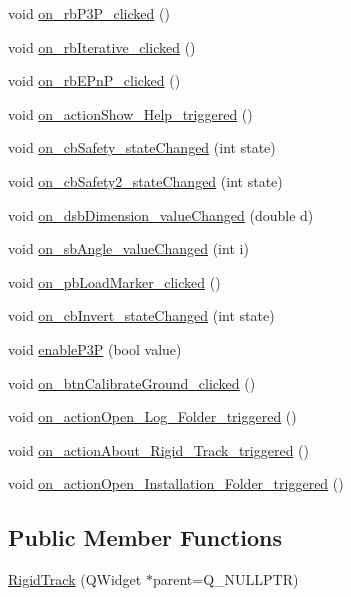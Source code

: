 \begin{DoxyCompactItemize}
\item 
void \hyperlink{class_rigid_track_ac1f10ea5ec3f718c152e245a04776454}{on\+\_\+rb\+P3\+P\+\_\+clicked} ()
\item 
void \hyperlink{class_rigid_track_ae5bcdd3fb7203b4a7d1fa97c1460af31}{on\+\_\+rb\+Iterative\+\_\+clicked} ()
\item 
void \hyperlink{class_rigid_track_a19bc46333f946e589184eeed998160da}{on\+\_\+rb\+E\+Pn\+P\+\_\+clicked} ()
\item 
void \hyperlink{class_rigid_track_af14465ac3ad6957b939c63cbae2d7d8c}{on\+\_\+action\+Show\+\_\+\+Help\+\_\+triggered} ()
\item 
void \hyperlink{class_rigid_track_a8f999fa968f4cc9fa548bdc8438b32c4}{on\+\_\+cb\+Safety\+\_\+state\+Changed} (int state)
\item 
void \hyperlink{class_rigid_track_ad6ba1cfe25f18ff0d9f5993aafa36d16}{on\+\_\+cb\+Safety2\+\_\+state\+Changed} (int state)
\item 
void \hyperlink{class_rigid_track_ae5e44de9f4e3cacdd647c0305936b02b}{on\+\_\+dsb\+Dimension\+\_\+value\+Changed} (double d)
\item 
void \hyperlink{class_rigid_track_a217ca3d828c99943ea155e6891264b24}{on\+\_\+sb\+Angle\+\_\+value\+Changed} (int i)
\item 
void \hyperlink{class_rigid_track_ad3e07592fbc1491cdc36dd5e817e1775}{on\+\_\+pb\+Load\+Marker\+\_\+clicked} ()
\item 
void \hyperlink{class_rigid_track_ab347b3edeca55685f4d601549596d44a}{on\+\_\+cb\+Invert\+\_\+state\+Changed} (int state)
\item 
void \hyperlink{class_rigid_track_a39aba14e1c846cb3f1773d9145cf96e1}{enable\+P3P} (bool value)
\item 
void \hyperlink{class_rigid_track_a9a939d6db3d268e75a603cb3d492a91b}{on\+\_\+btn\+Calibrate\+Ground\+\_\+clicked} ()
\item 
void \hyperlink{class_rigid_track_a63a85d33ef48741b0e671ebbbd43083a}{on\+\_\+action\+Open\+\_\+\+Log\+\_\+\+Folder\+\_\+triggered} ()
\item 
void \hyperlink{class_rigid_track_ac9b641557306f6dff0ac73bc3a9b3f60}{on\+\_\+action\+About\+\_\+\+Rigid\+\_\+\+Track\+\_\+triggered} ()
\item 
void \hyperlink{class_rigid_track_a7d858fcf6c9fe852ee3facfe6588aec1}{on\+\_\+action\+Open\+\_\+\+Installation\+\_\+\+Folder\+\_\+triggered} ()
\end{DoxyCompactItemize}
\subsection*{Public Member Functions}
\begin{DoxyCompactItemize}
\item 
\hyperlink{class_rigid_track_abd3d529ea29b1050439c97c5a5aa8c4b}{Rigid\+Track} (Q\+Widget $\ast$parent=Q\+\_\+\+N\+U\+L\+L\+P\+TR)
\end{DoxyCompactItemize}


